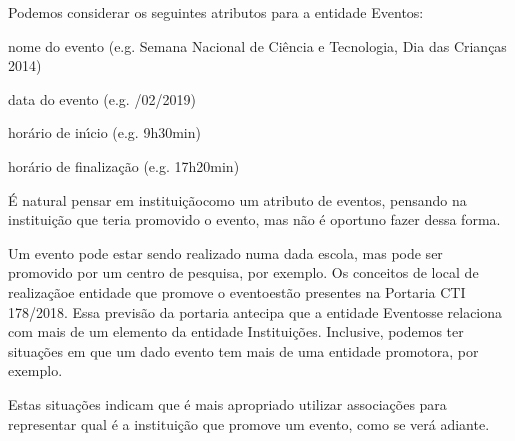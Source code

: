 \documentclass[
12pt,		%
openright,	%
twoside,  %
a4paper,			%
chapter=TITLE,		%
english,			%
french,				%
spanish,			%
brazil				%
]{USPSC-classe/USPSC}
\begin{document}
Podemos considerar os seguintes atributos para a entidade \textquotedbl Eventos\textquotedbl :











\begin{alineas}
\item nome do evento (e.g. \textquotedbl Semana Nacional de Ci\^encia e Tecnologia\textquotedbl , \textquotedbl Dia das Crian\c{c}as 2014\textquotedbl )
\item data do evento (e.g. /02/2019\textquotedbl )
\item hor\'ario de in\'{\i}cio (e.g. \textquotedbl 9h30min\textquotedbl )
\item hor\'ario de finaliza\c{c}\~ao (e.g. \textquotedbl 17h20min\textquotedbl )
\end{alineas}

\'E natural pensar em \textquotedbl institui\c{c}\~ao\textquotedbl  como um atributo de eventos, pensando na institui\c{c}\~ao que teria promovido o evento, mas n\~ao \'e oportuno fazer dessa forma.










Um evento pode estar sendo realizado numa dada escola, mas pode ser promovido por um centro de pesquisa, por exemplo. Os conceitos de \textquotedbl local de realiza\c{c}\~ao\textquotedbl  e \textquotedbl entidade que promove o evento\textquotedbl  est\~ao presentes na Portaria CTI 178/2018. Essa previs\~ao da portaria antecipa que a entidade \textquotedbl Eventos\textquotedbl  se relaciona com mais de um elemento da entidade \textquotedbl Institui\c{c}\~oes\textquotedbl . Inclusive, podemos ter situa\c{c}\~oes em que um dado evento tem mais de uma entidade promotora, por exemplo.










Estas situa\c{c}\~oes indicam que \'e mais apropriado utilizar associa\c{c}\~oes para representar qual \'e a institui\c{c}\~ao que promove um evento, como se ver\'a adiante.
\end{document}
